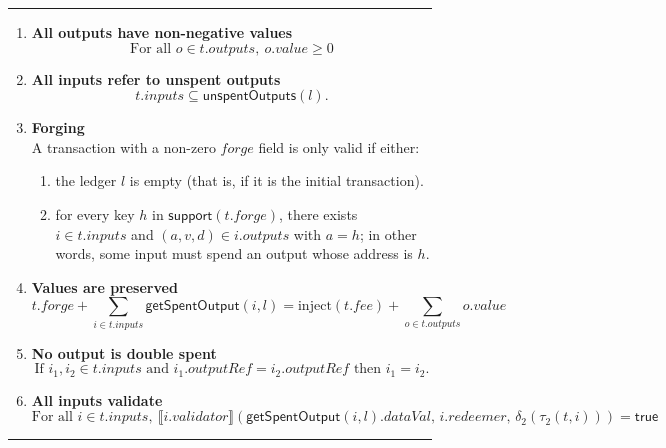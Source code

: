 \documentclass[a4paper]{article}
\newcommand{\msf}[1]{\ensuremath{\mathsf{#1}}}
\newcommand{\mi}[1]{\ensuremath{\mathit{#1}}}
\newcommand\rfskip{7pt}
\newenvironment{ruledfigure}[1]{\begin{figure}[#1]\hrule\vspace{\rfskip}}{\vspace{\rfskip}\hrule\end{figure}}
\newcommand{\true}{\textsf{true}}
\newcommand{\support}{\msf{support}}
\newcommand{\inputs}{\mi{inputs}}
\newcommand{\outputs}{\mi{outputs}}
\newcommand{\forge}{\mi{forge}}
\newcommand{\fee}{\mi{fee}}
\newcommand{\val}{\mi{value}}  %
\newcommand{\validator}{\mi{validator}}
\newcommand{\redeemer}{\mi{redeemer}}
\newcommand{\dataval}{\mi{dataVal}}
\newcommand{\outputref}{\mi{outputRef}}
\newcommand{\getSpent}{\msf{getSpentOutput}}
\newcommand{\unspent}{\msf{unspentOutputs}}
\newcommand{\injectNative}{\ensuremath{\mathrm{inject}}}
\begin{document}
\begin{ruledfigure}{H}
\begin{enumerate}

\item
  \label{rule:all-outputs-are-non-negative-2}
  \textbf{All outputs have non-negative values}
  \begin{displaymath}
    \textrm{For all } o \in t.\outputs,\ o.\val \geq 0
  \end{displaymath}

\item
  \label{rule:all-inputs-refer-to-unspent-outputs-2}
  \textbf{All inputs refer to unspent outputs}
  \begin{displaymath}
    t.\inputs \subseteq \unspent(l).
  \end{displaymath}

\item
  \label{rule:forging-2}
  \textbf{Forging}\\
  A transaction with a non-zero \forge{} field is only
  valid if either:
  \begin{enumerate}
    \item the ledger $l$ is empty (that is, if it is the initial transaction).
    \item \label{rule:custom-forge}
      for every key $h$ in $\support(t.\forge)$, there
      exists $i \in t.\inputs$ and $(a,v,d) \in i.\outputs$ with
      $a =h$; in other words, some input must spend an output
      whose address is $h$.
  \end{enumerate}

\item
  \label{rule:value-is-preserved-2}
  \textbf{Values are preserved}
  \begin{displaymath}
    t.\forge + \sum_{i \in t.\inputs} \getSpent(i, l) = \injectNative(t.\fee) + \sum_{o \in t.\outputs} o.\val
  \end{displaymath}

\item
  \label{rule:no-double-spending-2}
  \textbf{No output is double spent}
  \begin{displaymath}
    \textrm{If } i_1, i_2 \in t.\inputs \textrm{ and }  i_1.\outputref = i_2.\outputref
    \textrm{ then } i_1 = i_2.
  \end{displaymath}

\item
  \label{rule:all-inputs-validate-2}
  \textbf{All inputs validate}
  \begin{displaymath}
    \textrm{For all } i \in t.\inputs,\ \llbracket
    i.\validator\rrbracket(\getSpent(i,l).\dataval,\, i.\redeemer,\, \delta_2(\tau_2(t, i))) = \true
  \end{displaymath}


\end{enumerate}
\end{ruledfigure}
\end{document}
